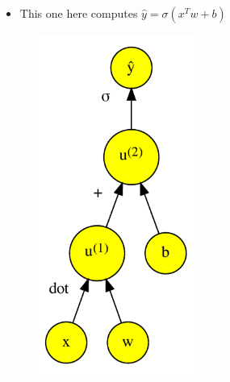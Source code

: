 \documentclass[handout]{beamer}
\begin{document}
\begin{frame}
    \begin{figure}
        \centering
        \begin{minipage}{0.45\textwidth}
            \begin{itemize}[<+->]
                \item This one here computes \(\hat{y} = \sigma (x^T w + b)\)
            \end{itemize}
        \end{minipage}\hfill
        \begin{minipage}{0.45\textwidth}
            \centering
            \begin{figure}[]
                \includegraphics[width=0.6\textwidth]{../plots/computational-graph-b-crop.pdf}
            \end{figure}
        \end{minipage}
    \end{figure}
\end{frame}
\end{document}
